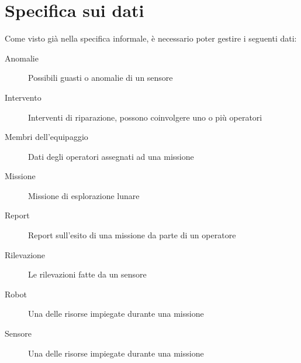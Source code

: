 \section{Specifica sui dati}
Come visto già nella specifica informale, è necessario poter gestire i seguenti dati:
\begin{description}
\item[Anomalie] Possibili guasti o anomalie di un sensore
\item[Intervento] Interventi di riparazione, possono coinvolgere uno o più operatori
\item[Membri dell'equipaggio] Dati degli operatori assegnati ad una missione
\item[Missione] Missione di esplorazione lunare
\item[Report] Report sull'esito di una missione da parte di un operatore
\item[Rilevazione] Le rilevazioni fatte da un sensore
\item[Robot] Una delle risorse impiegate durante una missione
\item[Sensore] Una delle risorse impiegate durante una missione
\end{description}
